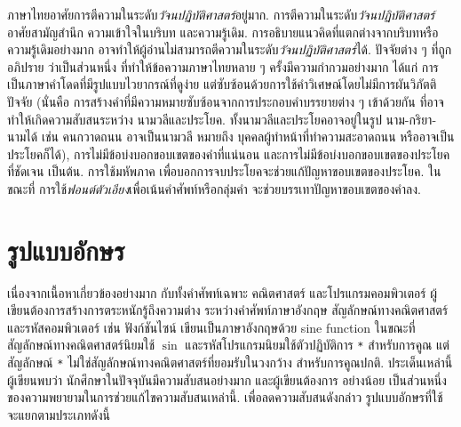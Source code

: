 	ภาษาไทยอาศัยการตีความในระดับ\textit{วัจนปฏิบัติศาสตร์}อยู่มาก.
	การตีความในระดับ\textit{วัจนปฏิบัติศาสตร์} อาศัยสามัญสำนึก ความเข้าใจในบริบท และความรู้เดิม.
	การอธิบายแนวคิดที่แตกต่างจากบริบทหรือความรู้เดิมอย่างมาก อาจทำให้ผู้อ่านไม่สามารถตีความในระดับ\textit{วัจนปฏิบัติศาสตร์}ได้.
	ปัจจัยต่าง ๆ ที่ถูกอภิปราย\cite{ThaiNLPTalk}
	ว่าเป็นส่วนหนึ่ง ที่ทำให้ข้อความภาษาไทยหลาย ๆ ครั้งมีความกำกวมอย่างมาก
	ได้แก่
	การเป็นภาษาคำโดดที่มีรูปแบบไวยากรณ์ที่ดูง่าย แต่ซับซ้อนด้วยการใช้คำวิเศษณ์โดยไม่มีการผันวิภัตติปัจจัย
	(นั่นคือ การสร้างคำที่มีความหมายซับซ้อนจากการประกอบคำบรรยายต่าง ๆ เข้าด้วยกัน 
	ที่อาจทำให้เกิดความสับสนระหว่าง นามวลีและประโยค. 
	ทั้งนามวลีและประโยคอาจอยู่ในรูป นาม-กริยา-นามได้ 
	เช่น คนกวาดถนน อาจเป็นนามวลี หมายถึง บุคคลผู้ทำหน้าที่ทำความสะอาดถนน หรืออาจเป็นประโยคก็ได้),
	การไม่มีข้อบ่งบอกขอบเขตของคำที่แน่นอน
	และการไม่มีข้อบ่งบอกขอบเขตของประโยคที่ชัดเจน เป็นต้น.
	การใช้มหัพภาค เพื่อบอกการจบประโยคจะช่วยแก้ปัญหาขอบเขตของประโยค.
	ในขณะที่ การใช้\textit{ฟอนต์ตัวเอียง}เพื่อเน้นคำศัพท์หรือกลุ่มคำ จะช่วยบรรเทาปัญหาขอบเขตของคำลง.

\vfill
\begin{Parallel}[c]{0.45\textwidth}{0.45\textwidth}
\end{Parallel}

\pagebreak

\section*{รูปแบบอักษร}

เนื่องจากเนื้อหาเกี่ยวข้องอย่างมาก
กับทั้งคำศัพท์เฉพาะ คณิตศาสตร์ และโปรแกรมคอมพิวเตอร์
ผู้เขียนต้องการสร้างการตระหนักรู้ถึงความต่าง
ระหว่างคำศัพท์ภาษาอังกฤษ สัญลักษณ์ทางคณิตศาสตร์ และรหัสคอมพิวเตอร์
เช่น ฟังก์ชันไซน์ เขียนเป็นภาษาอังกฤษด้วย sine function ในขณะที่สัญลักษณ์ทางคณิตศาสตร์นิยมใช้ $\sin$
และรหัสโปรแกรมนิยมใช้ตัวปฏิบัติการ \texttt{*} สำหรับการคูณ 
แต่สัญลักษณ์ \texttt{*} ไม่ใช่สัญลักษณ์ทางคณิตศาสตร์ที่ยอมรับในวงกว้าง สำหรับการคูณปกติ.
ประเด็นเหล่านี้ ผู้เขียนพบว่า นักศึกษาในปัจจุบันมีความสับสนอย่างมาก 
และผู้เขียนต้องการ อย่างน้อย เป็นส่วนหนึ่งของความพยายามในการช่วยแก้ไขความสับสนเหล่านี้.
เพื่อลดความสับสนดังกล่าว
รูปแบบอักษรที่ใช้ จะแยกตามประเภทดังนี้

